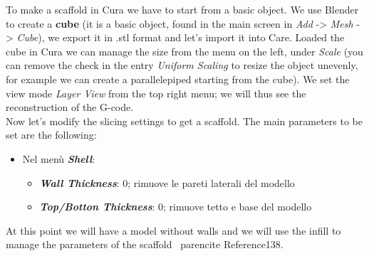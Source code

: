 To make a scaffold in Cura we have to start from a basic object. We use Blender to create a \textbf{cube} (it is a basic object, found in the main screen in \emph{Add} -> \emph{Mesh} -> \emph{Cube}), we export it in .stl format and let's import it into Care.
Loaded the cube in Cura we can manage the size from the menu on the left, under \emph{Scale} (you can remove the check in the entry \emph{Uniform Scaling} to resize the object unevenly, for example we can create a parallelepiped starting from the cube). We set the view mode \emph{Layer View} from the top right menu; we will thus see the reconstruction of the G-code. \\
Now let's modify the slicing settings to get a scaffold. The main parameters to be set are the following:

\begin{itemize}

\item Nel menù \emph{\textbf{Shell}}:
\begin{itemize}
\item \emph{\textbf{Wall Thickness}}: 0; rimuove le pareti laterali del modello
\item \emph{\textbf{Top/Botton Thickness}}: 0; rimuove tetto e base del modello
\end{itemize}

\end{itemize}

At this point we will have a model without walls and we will use the infill to manage the parameters of the scaffold \ parencite {Reference138}.

